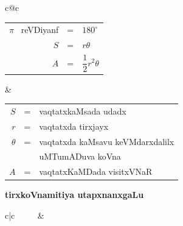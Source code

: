 \begin{center}
\begin{tabular}{c@{\qquad\quad}c}
\begin{tabular}[t]{r@{\;\;}c@{\;\;}l}
$\pi$~ reVDiyanf & = & $180^{\circ}$\\[3pt]
$S$ & = & $r\theta$\\[3pt]
$A$ & = & $\dfrac{1}{2}r^{2}\theta$
\end{tabular}
&
\begin{tabular}[t]{r@{\;\;}c@{\;\;}l}
$S$ & = & vaqtatxkaMsada udadx\\[3pt]
$r$ & = & vaqtatxda tirxjayx\\[3pt]
$\theta$ & = & vaqtatxda kaMsavu keVMdarxdalilx\\[1pt]
         &   & uMTumADuva koVna\\[3pt]
$A$ & = & vaqtatxKaMDada visitxVNaR
\end{tabular}
\end{tabular}
\end{center}

\begin{center}
{\large\bf tirxkoVnamitiya utapxnanxgaLu}
\smallskip
 
{\large\bf {}}
\end{center}

\begin{tabular}{c|c}
~~~~
& 
~~~
\end{tabular}


